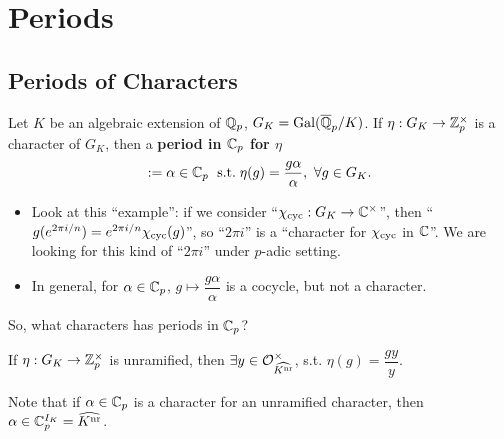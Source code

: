 \section{Periods}

\subsection{Periods of Characters}

Let $K$ be an algebraic extension of $\mathbb{Q}_p$,
$G_K = \operatorname{Gal}(\overline{\mathbb{Q}}_p/K)$.
If $\eta : G_K\to\mathbb{Z}_p^\times$ is a character of $G_K$,
then a \textbf{period in $\mathbb{C}_p$ for $\eta$} \[:= \alpha\in\mathbb{C}_p\ \;\mathrm{s.t.}\; \eta(g) = \frac{g\alpha}{\alpha},\ \forall g\in G_K.\]
\begin{remark}
    \begin{itemize}
        \item Look at this ``example'': if we consider ``$\chi_{\mathrm{cyc}} : G_K\to\mathbb{C}^\times$'',
        then ``$g(e^{2\pi i/n}) = e^{2\pi i/n}\chi_{\mathrm{cyc}}(g)$'',
        so ``$2\pi i$'' is a ``character for $\chi_{\mathrm{cyc}}$ in $\mathbb{C}$''.
        We are looking for this kind of ``$2\pi i$'' under $p$-adic setting.
        \item In general, for $\alpha\in\mathbb{C}_p$, $g\mapsto \dfrac{g\alpha}{\alpha}$ is a cocycle, but not a character.
    \end{itemize}
\end{remark}
So, what characters has periods in $\mathbb{C}_p$? 
\begin{theorem}\label{unramified character is Cp-admissible}
    If $\eta : G_K\to\mathbb{Z}_p^\times$ is unramified,
    then $\exists y\in\mathcal{O}_{\widehat{K^{\mathrm{nr}}}}^\times$, s.t. $\eta(g) = \dfrac{gy }{y}$. 
\end{theorem}
Note that if $\alpha\in\mathbb{C}_p$ is a character for an
unramified character, then
$\alpha\in \mathbb{C}_p^{I_K} = \widehat{K^{\mathrm{nr}}}$. 
